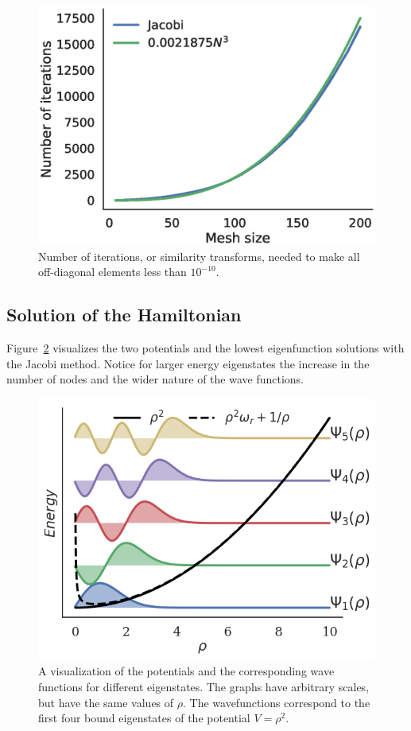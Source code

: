 \documentclass[aps,reprint]{revtex4-1}
\begin{document}
\begin{figure}[ht]
  \centering
  \includegraphics[width=\columnwidth]{figures/iterations.eps}
  \caption{\label{fig:juliaiterations} Number of iterations, or similarity
    transforms, needed to make all off-diagonal elements less than \(10^{-10}\).}
\end{figure}

\subsection{Solution of the Hamiltonian}
\label{sec:hamiltonsol}

Figure~\ref{fig:wavefunctions} visualizes the two potentials and the lowest
eigenfunction solutions with the Jacobi method. Notice for larger energy
eigenstates the increase in the number of nodes and the wider nature of
the wave functions.

\begin{figure}[ht]
  \centering
  \includegraphics[width=\columnwidth]{figures/wavefunctions.png}
  \caption{\label{fig:wavefunctions} A visualization of the potentials and the
    corresponding wave functions for different eigenstates. The graphs have
    arbitrary scales, but have the same values of $\rho$. The wavefunctions
    correspond to
    the first four bound eigenstates of the potential \(V=\rho^{2}\).}
\end{figure}
\end{document}

